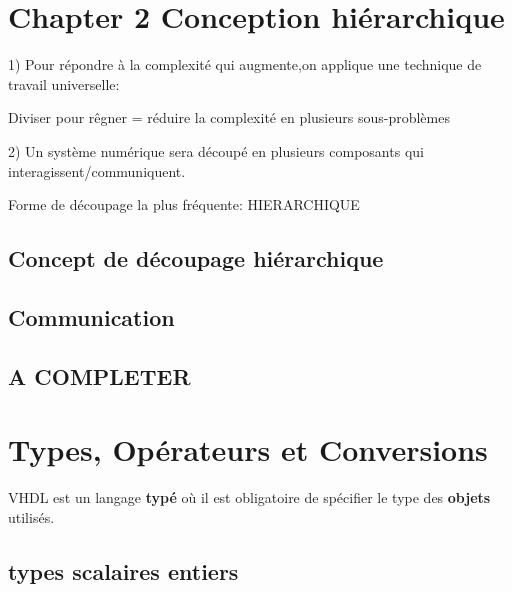 \newpage
\section{Chapter 2 Conception hiérarchique}
\begin{cisco}
1) Pour répondre à la complexité qui augmente,on applique une technique de travail universelle:

Diviser pour rêgner = réduire la complexité en plusieurs sous-problèmes

2) Un système numérique sera découpé en plusieurs composants qui interagissent/communiquent.

Forme de découpage la plus fréquente: HIERARCHIQUE
\end{cisco}

\subsection{Concept de découpage hiérarchique}
 
\subsection{Communication}
 
 
 \subsection{A COMPLETER}
 
 







\newpage
\section{Types, Opérateurs et Conversions}



VHDL est un langage \textbf{typé} où il est obligatoire de spécifier le type des \textbf{objets} utilisés.




\subsection{types scalaires entiers}






























